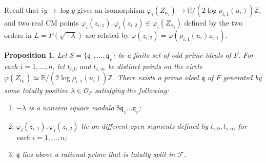 \documentclass{amsart}
\numberwithin{equation}{subsection}
\numberwithin{theorem}{section}
\newtheorem{proposition}[theorem]{Proposition}
\theoremstyle{definition}
\theoremstyle{remark}
\newcommand{\bZ}{\mathbb{Z}}
\newcommand{\cF}{\mathcal{F}}
\newcommand{\cO}{\mathcal{O}}
\newcommand{\fq}{\mathfrak{q}}
\begin{document}
Recall that $iy \mapsto \log y$ gives an isomorphism $\varphi_i(Z_{\alpha_i}) \to \mathbb{R}/(2\log \rho_{i,1}(u_i))\bZ$, and two real CM points $\varphi_i(z_{i,1}), \varphi_i(z_{i,2})\in\varphi_i(Z_{\alpha_i})$ defined by the two orders in $L = F(\sqrt{-\lambda})$ are related by $\varphi(z_{i,2}) = \varphi(\rho_{i,1}(u_i) z_{i,1})$.

\begin{proposition} \label{prop:equidistribution}
    Let $S = \{\fq_1, \dotsc, \fq_r\}$ be a finite set of odd prime ideals of $F$. 
    For each $i=1, \dotsc, n$, let $t_{i,0}$ and $ t_{i, \infty} $ be distinct points on the circle $ \varphi(Z_{\alpha_i}) \simeq \mathbb{R}/(2\log \rho_{i,1}(u_i))\bZ $. There exists a prime ideal $\fq$ of $F$ generated by some totally positive $\lambda\in\cO_F$ satisfying the following: \begin{enumerate}
        \item $-\lambda$ is a nonzero square modulo $8\fq_1\dotsc\fq_r$; 
        \item $\varphi_i(z_{i,1}), \varphi_{i}(z_{i,2})$ lie on different open segments defined by $t_{i,0}, t_{i, \infty}$ for each  $i=1, \dotsc, n$;
        \item $\fq$ lies above a rational prime that is totally split in $\cF$. 
    \end{enumerate}
\end{proposition}    
\end{document}
